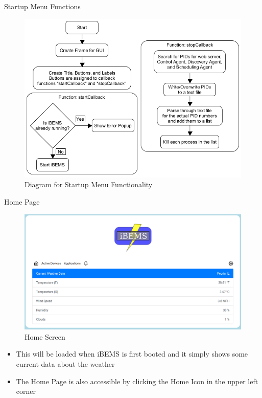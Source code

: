 \documentclass{beamer}
\begin{document}
\begin{frame}{Startup Menu Functions}{}
    \begin{figure}
        \centering
        \includegraphics[scale=0.45]{figs/GUI_Diagram.png}
        \caption{Diagram for Startup Menu Functionality}
        \label{fig:GUI_Diagram}
    \end{figure}
\end{frame}

\begin{frame}{Home Page}{} %
    \begin{figure}
        \centering
        \includegraphics[scale=0.2]{figs/Home_screen.png}
        \caption{Home Screen}
        \label{fig:Home_screen}
    \end{figure}
    
    \begin{small}
    \begin{itemize}
        \item This will be loaded when iBEMS is first booted and it simply shows some current data about the weather 
        \item The Home Page is also accessible by clicking the Home Icon in the upper left corner
    \end{itemize}
    \end{small}
\end{frame}
\end{document}
